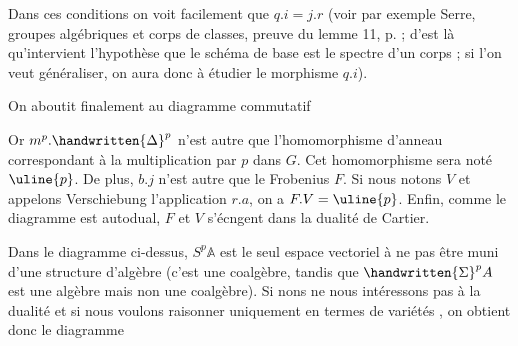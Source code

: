
Dans ces conditions on voit facilement que $q.i=j.r$ (voir par exemple Serre, groupes algébriques et corps de classes, preuve du lemme 11, p. ; d'est là qu'intervient l'hypothèse que le schéma de base est le spectre d'un corps ; si l'on veut généraliser, on aura donc à étudier le morphisme $q.i$).

On aboutit finalement au diagramme commutatif

Or $m^p.\handwritten{\Delta}^{p}$ n'est autre que l'homomorphisme d'anneau correspondant à la multiplication par $p$ dans $G$. Cet homomorphisme sera noté $\uline{p}$. De plus, $b.j$ n'est autre que le Frobenius $F$. Si nous notons $V$ et appelons Verschiebung l'application $r.a$, on a $F.V=\uline{p}$. Enfin, comme le diagramme est autodual, $F$ et $V$ s'écngent dans la dualité de Cartier.

Dans le diagramme ci-dessus, $S^p\mathbb{A}$ est le seul espace vectoriel à ne pas être muni d'une structure d'algèbre (c'est une coalgèbre, tandis que $\handwritten{\Sigma}^{p}A$ est une algèbre mais non une coalgèbre). Si nons ne nous intéressons pas à la dualité et si nous voulons raisonner uniquement en termes de variétés , on obtient donc le diagramme
